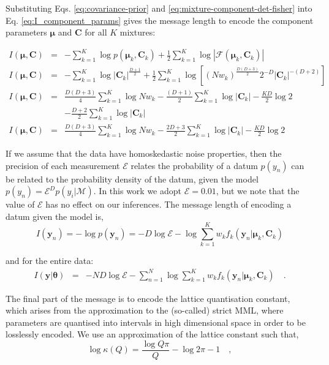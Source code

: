 \documentclass{elsarticle}
\newcommand{\vect}[1]{\boldsymbol{\mathbf{#1}}}
\def\veccov{\vect{C}}
\def\vecmean{\vect{\mu}}
\def\vectheta{\vect{\theta}}
\def\weight{w}
\def\datum{y}
\def\data{\vect{\datum}}
\newcommand{\fisher}[1]{\mathcal{F}\left(#1\right)}
\newcommand{\detfisher}[1]{\left|\fisher{#1}\right|}
\newcommand{\prior}[1]{p\left(#1\right)}
\begin{document}
Substituting Eqs. \ref{eq:covariance-prior} and \ref{eq:mixture-component-det-fisher} 
into Eq. \ref{eq:I_component_params} gives the message length to encode the component
parameters $\vecmean$ and $\veccov$ for all $K$ mixtures:

\begin{eqnarray}
  I(\vecmean,\veccov) &=& -\sum_{k=1}^{K}\log{\prior{{\vecmean_k,\veccov_k}}} + \frac{1}{2}\sum_{k=1}^{K}\log{\detfisher{{\vecmean_k,\veccov_k}}} \nonumber \\
  I(\vecmean,\veccov) &=& -\sum_{k=1}^{K}\log{|\veccov_k|^{\frac{D + 1}{2}}}
    + \frac{1}{2}\sum_{k=1}^{K}\log{\left[(N\weight_k)^\frac{D(D+3)}{2}2^{-D}|\veccov_k|^{-(D+2)}\right]} \nonumber \\
  I(\vecmean,\veccov) &=& \frac{D(D+3)}{4}\sum_{k=1}^{K}\log{N\weight_k} -\frac{(D + 1)}{2}\sum_{k=1}^{K}\log{|\veccov_k|}
    -\frac{KD}{2}\log{2} \nonumber \\
  && -\frac{D+2}{2}\sum_{k=1}^{K}\log{|\veccov_k|} \nonumber \\
  I(\vecmean,\veccov) &=& \frac{D(D+3)}{4}\sum_{k=1}^{K}\log{N\weight_k} -\frac{2D+3}{2}\sum_{k=1}^{K}\log{|\veccov_k|} - \frac{KD}{2}\log{2} 
\end{eqnarray}


If we assume that the data have homoskedastic noise properties, then the 
precision of each measurement $\mathcal{E}$ relates the probability of a
datum $p(\datum_n)$ can be related to the probability density of
the datum, given the model 
$p(\datum_n) = \mathcal{E}^{D}p(y_i|\mathcal{M})$.
In this work we adopt $\mathcal{E} = 0.01$, but we note that the value of
$\mathcal{E}$ has no effect on our inferences.  The message length of encoding
a datum given the model is,
\begin{equation}
  I(\data_n) = -\log{p(\data_n)} = -D\log\mathcal{E} - \log\sum_{k=1}^{K}\weight_{k}f_{k}(\data_n|\vecmean_k,\veccov_k)
\end{equation}

\noindent{}and for the entire data:
\begin{eqnarray}
  I(\data|\vectheta) &=& -ND\log\mathcal{E} - \sum_{n=1}^{N}\log\sum_{k=1}^{K}w_{k}f_k(\data_n|\vecmean_k,\veccov_k) \quad .
\end{eqnarray}

The final part of the message is to encode the lattice quantisation constant,
which arises from the approximation to the (so-called) strict MML, where
parameters are quantised into intervals in high dimensional space in order to
be losslessly encoded.  We use an approximation of the lattice constant
\citep[see Sections 5.1.12 and 3.3.4 of ]
{Wallace_2005} such that,
\begin{equation}
  \log\kappa(Q) = \frac{\log{Q\pi}}{Q} - \log{2\pi} - 1 \quad ,
\end{equation}
\end{document}
